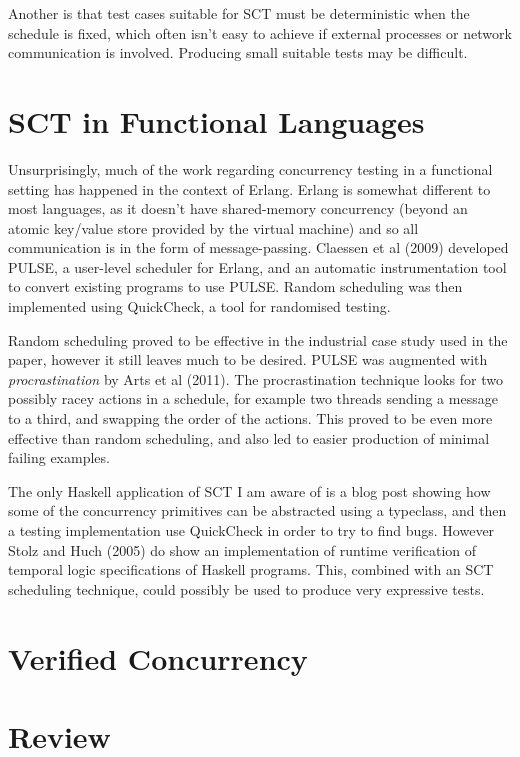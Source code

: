 Another is that test cases suitable for SCT must be deterministic when
the schedule is fixed, which often isn't easy to achieve if external
processes or network communication is involved. Producing small
suitable tests may be difficult.

\section{SCT in Functional Languages}
\label{sec:litrev-sctfunc}

Unsurprisingly, much of the work regarding concurrency testing in a
functional setting has happened in the context of Erlang. Erlang is
somewhat different to most languages, as it doesn't have shared-memory
concurrency (beyond an atomic key/value store provided by the virtual
machine) and so all communication is in the form of
message-passing. Claessen et al (2009)\nocite{pulse} developed PULSE,
a user-level scheduler for Erlang, and an automatic instrumentation
tool to convert existing programs to use PULSE. Random scheduling was
then implemented using QuickCheck, a tool for randomised testing.

Random scheduling proved to be effective in the industrial case study
used in the paper, however it still leaves much to be desired. PULSE
was augmented with \textit{procrastination} by Arts et al (2011). The
procrastination technique looks for two possibly racey actions in a
schedule, for example two threads sending a message to a third, and
swapping the order of the actions. This proved to be even more
effective than random scheduling, and also led to easier production of
minimal failing examples.

The only Haskell application of SCT I am aware of is a blog
post\cite{typeclass} showing how some of the concurrency primitives
can be abstracted using a typeclass, and then a testing implementation
use QuickCheck in order to try to find bugs. However Stolz and Huch
(2005)\nocite{rvhaskell} do show an implementation of runtime
verification of temporal logic specifications of Haskell
programs. This, combined with an SCT scheduling technique, could
possibly be used to produce very expressive tests.

\section{Verified Concurrency}
\label{sec:litref-verify}


\section{Review}
\label{sec:litrev-review}

